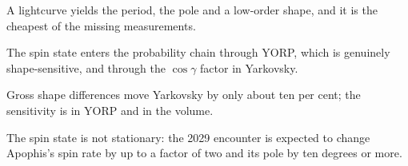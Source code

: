 \begin{keytakeaways}
\item A lightcurve yields the period, the pole and a low-order shape, and it
is the cheapest of the missing measurements.
\item The spin state enters the probability chain through YORP, which is
genuinely shape-sensitive, and through the \(\cos\gamma\) factor in
Yarkovsky.
\item Gross shape differences move Yarkovsky by only about ten per cent; the
sensitivity is in YORP and in the volume.
\item The spin state is not stationary: the 2029 encounter is expected to
change Apophis's spin rate by up to a factor of two and its pole by ten
degrees or more.
\end{keytakeaways}
